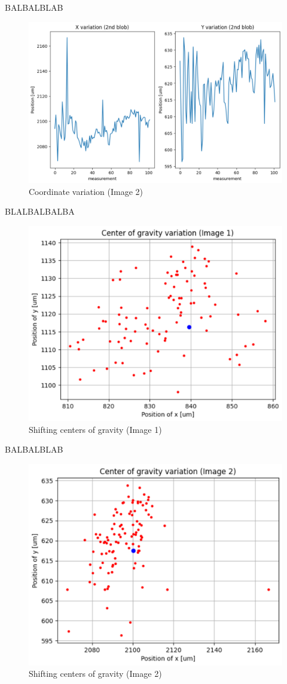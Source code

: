 BALBALBLAB
\begin{figure}[H]
    \centering
    \includegraphics[scale=0.65]{assets/figures/MesuresResultats/VariationImage2.png}
    \caption{Coordinate variation (Image 2)}
    \label{fig:MES_VarIm2}
\end{figure}
BLALBALBALBA
\begin{figure}[H]
    \centering
    \includegraphics[scale=0.65]{assets/figures/MesuresResultats/VariationCenter1.png}
    \caption{Shifting centers of gravity (Image 1)}
    \label{fig:MES_VarCenter1}
\end{figure}
BALBALBLAB
\begin{figure}[H]
    \centering
    \includegraphics[scale=0.65]{assets/figures/MesuresResultats/VariationCenter2.png}
    \caption{Shifting centers of gravity (Image 2)}
    \label{fig:MES_VarCenter2}
\end{figure}